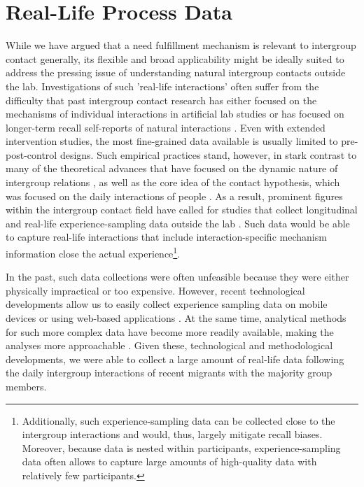 \documentclass[man, 12pt, a4paper, mask]{apa7}
\theoremstyle{break}
\theoremstyle{plain}
\begin{document}
\section{Real-Life Process Data}
While we have argued that a need fulfillment mechanism is relevant to intergroup contact generally, its flexible and broad applicability might be ideally suited to address the pressing issue of understanding natural intergroup contacts outside the lab. Investigations of such 'real-life interactions' often suffer from the difficulty that past intergroup contact research has either focused on the mechanisms of individual interactions in artificial lab studies or has focused on longer-term recall self-reports of natural interactions \citep[e.g.,][]{Pettigrew2006}. Even with extended intervention studies, the most fine-grained data available is usually limited to pre-post-control designs. Such empirical practices stand, however, in stark contrast to many of the theoretical advances that have focused on the dynamic nature of intergroup relations \citep[e.g.,][]{Pettigrew1998}, as well as the core idea of the contact hypothesis, which was focused on the daily interactions of people \citep[see][]{Allport1954b}. As a result, prominent figures within the intergroup contact field have called for studies that collect longitudinal \citep[][]{Pettigrew1998, Pettigrew2008, Pettigrew2008b, Pettigrew2011} and real-life experience-sampling data outside the lab \citep[][]{MacInnis2015, McKeown2017, Dixon2005}. Such data would be able to capture real-life interactions that include interaction-specific mechanism information close the actual experience\footnote{Additionally, such experience-sampling data can be collected close to the intergroup interactions and would, thus, largely mitigate recall biases. Moreover, because data is nested within participants, experience-sampling data often allows to capture large amounts of high-quality data with relatively few participants.}.

In the past, such data collections were often unfeasible because they were either physically impractical or too expensive. However, recent technological developments allow us to easily collect experience sampling data on mobile devices \citep[e.g.,][]{Keil2020} or using web-based applications \citep[e.g.,][]{Arslan2020}. At the same time, analytical methods for such more complex data have become more readily available, making the analyses more approachable \citep[see, e.g.,][]{ODonnell2021}. Given these, technological and methodological developments, we were able to collect a large amount of real-life data following the daily intergroup interactions of recent migrants with the majority group members.  
\end{document}
